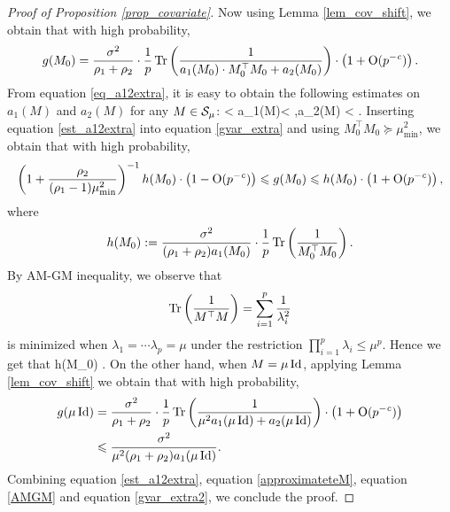 \begin{proof}[Proof of Proposition \ref{prop_covariate}]
Now using Lemma \ref{lem_cov_shift}, we obtain that with high probability,
\begin{align}\label{gvar_extra}
g(M_0)= \frac{\sigma^2}{\rho_1+\rho_2}\cdot \frac1p\tr\left( \frac{1}{a_1(M_0)\cdot M_0^\top M_0 + a_2(M_0)}\right) \cdot \left(1 +\OO(p^{-\e})\right).
\end{align}
From equation \eqref{eq_a12extra}, it is easy to obtain the following estimates on $ a_1(M)$ and $a_2(M)$ for any $M\in \cal S_\mu$:
\be\label{est_a12extra}
 < a_1(M)<  ,\quad a_2(M) < .
\ee
Inserting equation \eqref{est_a12extra} into equation \eqref{gvar_extra} and using $ M_0^\top M_0\succeq \mu_{\min}^2$, we obtain that with high probability,
\begin{align}\label{approximateteM}
\left(1+\frac{\rho_2}{(\rho_1-1)\mu_{\min}^2}\right)^{-1}h(M_0) \cdot \left(1 - \OO(p^{-\e})\right) \le g(M_0) \le h(M_0) \cdot \left(1 +\OO(p^{-\e})\right),
\end{align}
where
$$h(M_0):=\frac{\sigma^2}{(\rho_1+\rho_2)a_1(M_0)}\cdot \frac1p\tr\left( \frac{1}{M_0^\top M_0}\right) .$$
%
By AM-GM inequality, we observe that 
$$\tr\left( \frac{1}{M^\top M}\right) = \sum_{i=1}^p\frac{1}{\lambda_i^2}$$
is minimized when $\lambda_1 = \cdots\lambda_p=\mu$ under the restriction $\prod_{i=1}^p\lambda_i\le \mu^p$. Hence we get that 
\be\label{AMGM} h(M_0) \le {}.\ee
On the other hand, when $M=\mu \id$, applying Lemma \ref{lem_cov_shift} we obtain that with high probability,
\begin{align}\label{gvar_extra2}
\begin{split}
g(\mu \id)&= \frac{\sigma^2}{\rho_1+\rho_2}\cdot \frac1p\tr\left( \frac{1}{\mu^2 a_1 (\mu\id) + a_2(\mu\id)}\right) \cdot \left(1 +\OO(p^{-\e})\right)\\
&\le \frac{\sigma^2}{\mu^2(\rho_1+\rho_2)a_1 (\mu\id)}.
\end{split}
\end{align}
Combining equation \eqref{est_a12extra}, equation \eqref{approximateteM}, equation \eqref{AMGM} and equation \eqref{gvar_extra2}, we conclude the proof.
\end{proof}
 \fi

